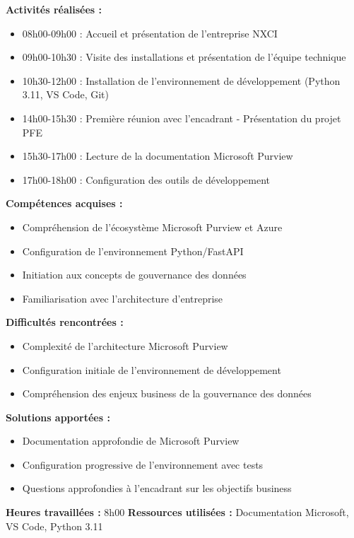 \documentclass[12pt,a4paper]{article}
\begin{document}
\textbf{Activités réalisées :}
\begin{itemize}
    \item 08h00-09h00 : Accueil et présentation de l'entreprise NXCI
    \item 09h00-10h30 : Visite des installations et présentation de l'équipe technique
    \item 10h30-12h00 : Installation de l'environnement de développement (Python 3.11, VS Code, Git)
    \item 14h00-15h30 : Première réunion avec l'encadrant - Présentation du projet PFE
    \item 15h30-17h00 : Lecture de la documentation Microsoft Purview
    \item 17h00-18h00 : Configuration des outils de développement
\end{itemize}

\textbf{Compétences acquises :}
\begin{itemize}
    \item Compréhension de l'écosystème Microsoft Purview et Azure
    \item Configuration de l'environnement Python/FastAPI
    \item Initiation aux concepts de gouvernance des données
    \item Familiarisation avec l'architecture d'entreprise
\end{itemize}

\textbf{Difficultés rencontrées :}
\begin{itemize}
    \item Complexité de l'architecture Microsoft Purview
    \item Configuration initiale de l'environnement de développement
    \item Compréhension des enjeux business de la gouvernance des données
\end{itemize}

\textbf{Solutions apportées :}
\begin{itemize}
    \item Documentation approfondie de Microsoft Purview
    \item Configuration progressive de l'environnement avec tests
    \item Questions approfondies à l'encadrant sur les objectifs business
\end{itemize}

\textbf{Heures travaillées :} 8h00
\textbf{Ressources utilisées :} Documentation Microsoft, VS Code, Python 3.11
\end{document}
